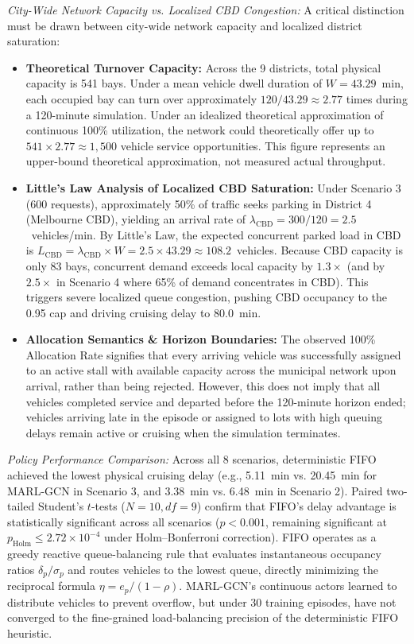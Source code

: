 \documentclass[journal]{IEEEtran}
\begin{document}
\textit{City-Wide Network Capacity vs. Localized CBD Congestion:}
A critical distinction must be drawn between city-wide network capacity and localized district saturation:
\begin{itemize}
    \item \textbf{Theoretical Turnover Capacity:} Across the 9 districts, total physical capacity is 541 bays. Under a mean vehicle dwell duration of $W = 43.29$~min, each occupied bay can turn over approximately $120 / 43.29 \approx 2.77$ times during a 120-minute simulation. Under an idealized theoretical approximation of continuous 100\% utilization, the network could theoretically offer up to $541 \times 2.77 \approx 1,500$ vehicle service opportunities. This figure represents an upper-bound theoretical approximation, not measured actual throughput.
    \item \textbf{Little's Law Analysis of Localized CBD Saturation:} Under Scenario 3 (600 requests), approximately 50\% of traffic seeks parking in District 4 (Melbourne CBD), yielding an arrival rate of $\lambda_{\text{CBD}} = 300 / 120 = 2.5$~vehicles/min. By Little's Law, the expected concurrent parked load in CBD is $L_{\text{CBD}} = \lambda_{\text{CBD}} \times W = 2.5 \times 43.29 \approx 108.2$~vehicles. Because CBD capacity is only 83 bays, concurrent demand exceeds local capacity by $1.3\times$ (and by $2.5\times$ in Scenario 4 where 65\% of demand concentrates in CBD). This triggers severe localized queue congestion, pushing CBD occupancy to the 0.95 cap and driving cruising delay to 80.0~min.
    \item \textbf{Allocation Semantics & Horizon Boundaries:} The observed 100\% Allocation Rate signifies that every arriving vehicle was successfully assigned to an active stall with available capacity across the municipal network upon arrival, rather than being rejected. However, this does not imply that all vehicles completed service and departed before the 120-minute horizon ended; vehicles arriving late in the episode or assigned to lots with high queuing delays remain active or cruising when the simulation terminates.
\end{itemize}

\textit{Policy Performance Comparison:}
Across all 8 scenarios, deterministic FIFO achieved the lowest physical cruising delay (e.g., 5.11~min vs. 20.45~min for MARL-GCN in Scenario 3, and 3.38~min vs. 6.48~min in Scenario 2). Paired two-tailed Student's $t$-tests ($N=10, df=9$) confirm that FIFO's delay advantage is statistically significant across all scenarios ($p < 0.001$, remaining significant at $p_{\text{Holm}} \le 2.72 \times 10^{-4}$ under Holm--Bonferroni correction). FIFO operates as a greedy reactive queue-balancing rule that evaluates instantaneous occupancy ratios $\delta_p / \sigma_p$ and routes vehicles to the lowest queue, directly minimizing the reciprocal formula $\eta = e_p / (1 - \rho)$. MARL-GCN's continuous actors learned to distribute vehicles to prevent overflow, but under 30 training episodes, have not converged to the fine-grained load-balancing precision of the deterministic FIFO heuristic.
\end{document}
